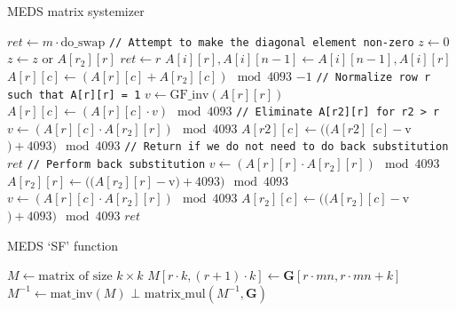 \begin{algorithm}
  \caption{MEDS matrix systemizer}
  \label{alg:systemizer}
  \begin{algorithmic}
      \State $ret \gets m \cdot \text{do\_swap}$
        \State \texttt{// Attempt to make the diagonal element non-zero}
          \State $z \gets 0$
            \State $z \gets z$ or $A[r_2][r]$
          \EndFor
            \State $ret \gets r$
              \State $A[i][r], A[i][n-1] \gets A[i][n-1], A[i][r]$
            \EndFor
          \EndIf
        \EndIf
              \State $A[r][c] \gets (A[r][c] + A[r_2][c]) \mod 4093$
            \EndFor
          \EndIf
        \EndFor
          \State \Return $-1$
        \EndIf
        \State \texttt{// Normalize row r such that A[r][r] = 1}
        \State $v \gets \text{GF\_inv}(A[r][r])$
          \State $A[r][c] \gets (A[r][c] \cdot v) \mod 4093$
        \EndFor
        \State \texttt{// Eliminate A[r2][r] for r2 > r}
            \State $v \gets (A[r][c] \cdot A[r_2][r]) \mod 4093$
            \State $A[r2][c] \gets ((A[r2][c] - $v$) + 4093) \mod 4093$
          \EndFor
        \EndFor
      \EndFor
      \State \texttt{// Return if we do not need to do back substitution}
        \State \Return $ret$
      \EndIf
      \State \texttt{// Perform back substitution}
          \State $v \gets (A[r][r] \cdot A[r_2][r]) \mod 4093$
          \State $A[r_2][r] \gets ((A[r_2][r] - $v$) + 4093) \mod 4093$
            \State $v \gets (A[r][c] \cdot A[r_2][r]) \mod 4093$
            \State $A[r_2][c] \gets ((A[r_2][c] - $v$) + 4093) \mod 4093$
          \EndFor
        \EndFor
      \EndFor
      \State \Return $ret$
    \EndFunction
  \end{algorithmic}
\end{algorithm}

\begin{algorithm}
  \caption{MEDS `SF' function}
  \label{alg:medssffunction}
  \begin{algorithmic}
      \State $M \gets \text{matrix of size } k \times k$
        \State $M[r \cdot k, (r+1) \cdot k] \gets \textbf{G}[r \cdot mn, r \cdot mn + k]$
      \EndFor
      \State $M^{-1} \gets \text{mat\_inv}(M)$
        \State \Return $\bot$
      \EndIf
      \State \Return $\text{matrix\_mul}(M^{-1}, \textbf{G})$
    \EndFunction
  \end{algorithmic}
\end{algorithm}